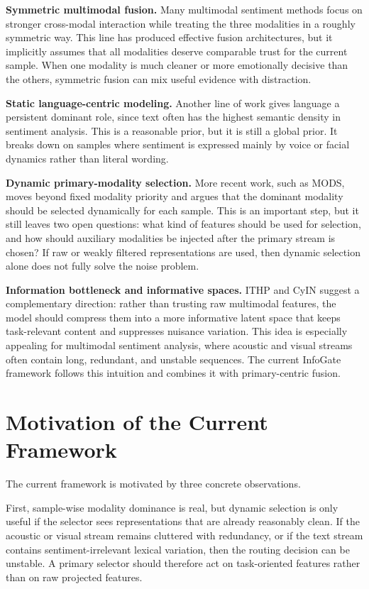 \documentclass[11pt]{article}
\begin{document}
\noindent \textbf{Symmetric multimodal fusion.} Many multimodal sentiment methods
focus on stronger cross-modal interaction while treating the three modalities in
a roughly symmetric way. This line has produced effective fusion architectures,
but it implicitly assumes that all modalities deserve comparable trust for the
current sample. When one modality is much cleaner or more emotionally decisive
than the others, symmetric fusion can mix useful evidence with distraction.

\noindent \textbf{Static language-centric modeling.} Another line of work gives
language a persistent dominant role, since text often has the highest semantic
density in sentiment analysis. This is a reasonable prior, but it is still a
global prior. It breaks down on samples where sentiment is expressed mainly by
voice or facial dynamics rather than literal wording.

\noindent \textbf{Dynamic primary-modality selection.} More recent work, such as
MODS, moves beyond fixed modality priority and argues that the dominant modality
should be selected dynamically for each sample. This is an important step, but
it still leaves two open questions: what kind of features should be used for
selection, and how should auxiliary modalities be injected after the primary
stream is chosen? If raw or weakly filtered representations are used, then
dynamic selection alone does not fully solve the noise problem.

\noindent \textbf{Information bottleneck and informative spaces.} ITHP and CyIN
suggest a complementary direction: rather than trusting raw multimodal features,
the model should compress them into a more informative latent space that keeps
task-relevant content and suppresses nuisance variation. This idea is especially
appealing for multimodal sentiment analysis, where acoustic and visual streams
often contain long, redundant, and unstable sequences. The current InfoGate
framework follows this intuition and combines it with primary-centric fusion.

\section{Motivation of the Current Framework}

The current framework is motivated by three concrete observations.

First, sample-wise modality dominance is real, but dynamic selection is only
useful if the selector sees representations that are already reasonably clean.
If the acoustic or visual stream remains cluttered with redundancy, or if the
text stream contains sentiment-irrelevant lexical variation, then the routing
decision can be unstable. A primary selector should therefore act on
task-oriented features rather than on raw projected features.
\end{document}
